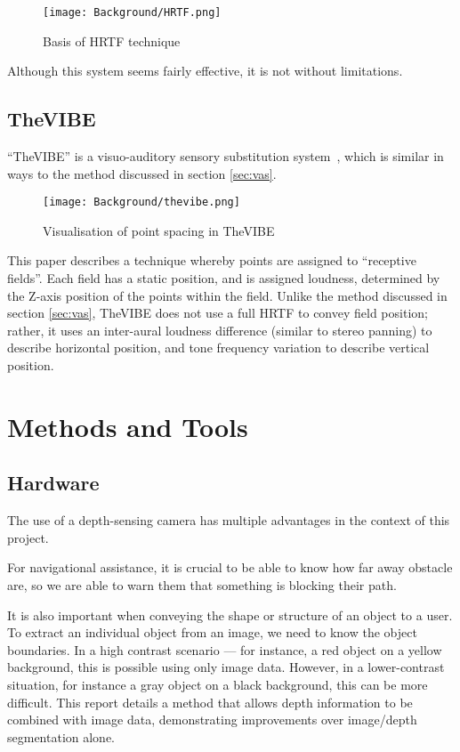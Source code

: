 \begin{figure}[H]
    \centering
    \texttt{[image: Background/HRTF.png]}
    \caption{Basis of HRTF technique~\cite{hrtf-diagram}}
\end{figure}

Although this system seems fairly effective, it is not without limitations.  

\subsection{TheVIBE}
``TheVIBE'' is a visuo-auditory sensory substitution system~\cite{thevibe}, which is similar in ways to the method discussed in section \ref{sec:vas}.

\begin{figure}[H]
    \centering
    \texttt{[image: Background/thevibe.png]}
    \caption{Visualisation of point spacing in TheVIBE}
\end{figure}

This paper describes a technique whereby points are assigned to ``receptive fields''. Each field has a static position, and is assigned loudness, determined by the Z-axis position of the points within the field. Unlike the method discussed in section \ref{sec:vas}, TheVIBE does not use a full \ac{HRTF} to convey field position; rather, it uses an inter-aural loudness difference (similar to stereo panning) to describe horizontal position, and tone frequency variation to describe vertical position.

\section{Methods and Tools}
\subsection{Hardware}
The use of a depth-sensing camera has multiple advantages in the context of this project.

For navigational assistance, it is crucial to be able to know how far away obstacle are, so we are able to warn them that something is blocking their path.

It is also important when conveying the shape or structure of an object to a user. To extract an individual object from an image, we need to know the object boundaries. In a high contrast scenario --- for instance, a red object on a yellow background, this is possible using only image data. However, in a lower-contrast situation, for instance a gray object on a black background, this can be more difficult. This report details a method that allows depth information to be combined with image data, demonstrating improvements over image/depth segmentation alone. 

